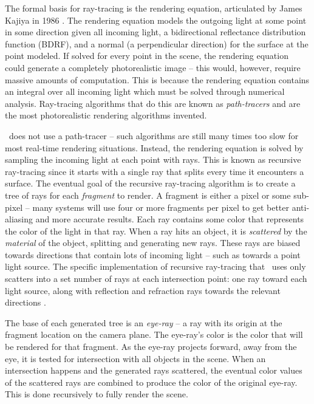 The formal basis for ray-tracing is the rendering equation, articulated by James Kajiya in 1986 \cite{kajiya1986rendering}.
The rendering equation models the outgoing light at some point in some direction given all incoming light, a bidirectional reflectance distribution function (BDRF), and a normal (a perpendicular direction) for the surface at the point modeled.
If solved for every point in the scene, the rendering equation could generate a completely photorealistic image -- this would, however, require massive amounts of computation.
This is because the rendering equation contains an integral over all incoming light which must be solved through numerical analysis.
Ray-tracing algorithms that do this are known as {\it path-tracers} and are the most photorealistic rendering algorithms invented.

\name\ does not use a path-tracer -- such algorithms are still many times too slow for most real-time rendering situations.
Instead, the rendering equation is solved by sampling the incoming light at each point with rays.
This is known as recursive ray-tracing since it starts with a single ray that splits every time it encounters a surface.
The eventual goal of the recursive ray-tracing algorithm is to create a tree of rays for each {\it fragment} to render.
A fragment is either a pixel or some sub-pixel -- many systems will use four or more fragments per pixel to get better anti-aliasing and more accurate results.
Each ray contains some color that represents the color of the light in that ray.
When a ray hits an object, it is {\it scattered} by the {\it material} of the object, splitting and generating new rays.
These rays are biased towards directions that contain lots of incoming light -- such as towards a point light source.
The specific implementation of recursive ray-tracing that \name\ uses only scatters into a set number of rays at each intersection point: one ray toward each light source, along with reflection and refraction rays towards the relevant directions .

The base of each generated tree is an {\it eye-ray} -- a ray with its origin at the fragment location on the camera plane.
The eye-ray's color is the color that will be rendered for that fragment.
As the eye-ray projects forward, away from the eye, it is tested for intersection with all objects in the scene.
When an intersection happens and the generated rays scattered, the eventual color values of the scattered rays are combined to produce the color of the original eye-ray.
This is done recursively to fully render the scene.

